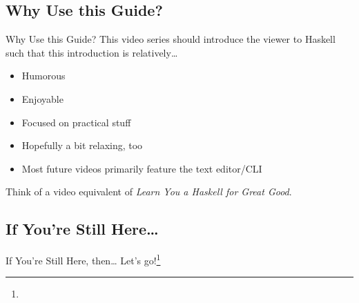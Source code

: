 \documentclass{beamer}
\begin{document}
		\subsection{Why Use this Guide?}
			\begin{frame}{Why Use this Guide?}
				This video series should introduce the viewer to Haskell such
				that this introduction is relatively\dots
				\begin{itemize}
					\item Humorous
					\item Enjoyable
					\item Focused on practical stuff
					\item Hopefully a bit relaxing, too
					\item Most future videos primarily feature the text editor/CLI
				\end{itemize}
				Think of a video equivalent of
				\textit{Learn You a Haskell for Great Good}.
			\end{frame}
		\subsection{If You're Still Here\dots}
			\begin{frame}{If You're Still Here, then\dots}
				\huge{Let's go!}\footnote{}
			\end{frame}
\end{document}
